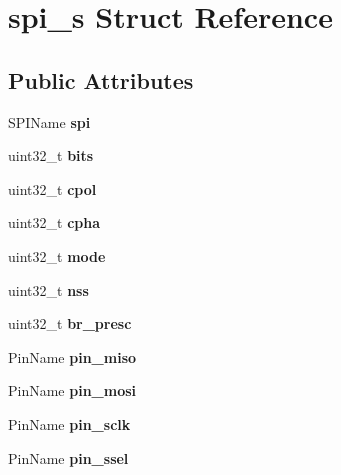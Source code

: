 \hypertarget{structspi__s}{}\section{spi\+\_\+s Struct Reference}
\label{structspi__s}
\subsection*{Public Attributes}
\begin{DoxyCompactItemize}
\item 
S\+P\+I\+Name {\bfseries spi}\hypertarget{structspi__s_ac7d1085d365b4c8a8c551968e17c4a9a}{}\label{structspi__s_ac7d1085d365b4c8a8c551968e17c4a9a}

\item 
uint32\+\_\+t {\bfseries bits}\hypertarget{structspi__s_aabdbf3095aa95c537e632b1c072ddff6}{}\label{structspi__s_aabdbf3095aa95c537e632b1c072ddff6}

\item 
uint32\+\_\+t {\bfseries cpol}\hypertarget{structspi__s_a3c5643b3483b50c75267e8fd8792cd31}{}\label{structspi__s_a3c5643b3483b50c75267e8fd8792cd31}

\item 
uint32\+\_\+t {\bfseries cpha}\hypertarget{structspi__s_a0014afe4630d42dde92493768cb0cc89}{}\label{structspi__s_a0014afe4630d42dde92493768cb0cc89}

\item 
uint32\+\_\+t {\bfseries mode}\hypertarget{structspi__s_aee6b48128660fbef65c825f8e8f03f94}{}\label{structspi__s_aee6b48128660fbef65c825f8e8f03f94}

\item 
uint32\+\_\+t {\bfseries nss}\hypertarget{structspi__s_a7a039f785d07594c3f65f162cdf8528f}{}\label{structspi__s_a7a039f785d07594c3f65f162cdf8528f}

\item 
uint32\+\_\+t {\bfseries br\+\_\+presc}\hypertarget{structspi__s_a56fcb76105c8ae6327328a133e7fe526}{}\label{structspi__s_a56fcb76105c8ae6327328a133e7fe526}

\item 
Pin\+Name {\bfseries pin\+\_\+miso}\hypertarget{structspi__s_aabe4f8d7b3069fe9bb58a8b8c6b3c75e}{}\label{structspi__s_aabe4f8d7b3069fe9bb58a8b8c6b3c75e}

\item 
Pin\+Name {\bfseries pin\+\_\+mosi}\hypertarget{structspi__s_ae9bee16d23aa832f484a27507b8383d9}{}\label{structspi__s_ae9bee16d23aa832f484a27507b8383d9}

\item 
Pin\+Name {\bfseries pin\+\_\+sclk}\hypertarget{structspi__s_a01a83c91abc93e7c3fab051ebe1a8765}{}\label{structspi__s_a01a83c91abc93e7c3fab051ebe1a8765}

\item 
Pin\+Name {\bfseries pin\+\_\+ssel}\hypertarget{structspi__s_acfec785ecd6069d9d175a019cf20eb52}{}\label{structspi__s_acfec785ecd6069d9d175a019cf20eb52}

\end{DoxyCompactItemize}


